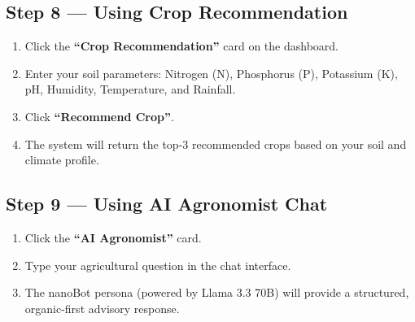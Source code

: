 \documentclass[12pt,oneside]{report}
\begin{document}
\subsection{Step 8 — Using Crop Recommendation}
\begin{enumerate}
    \item Click the \textbf{``Crop Recommendation''} card on the dashboard.
    \item Enter your soil parameters: Nitrogen (N), Phosphorus (P), Potassium (K), pH, Humidity, Temperature, and Rainfall.
    \item Click \textbf{``Recommend Crop''}.
    \item The system will return the top-3 recommended crops based on your soil and climate profile.
\end{enumerate}

\subsection{Step 9 — Using AI Agronomist Chat}
\begin{enumerate}
    \item Click the \textbf{``AI Agronomist''} card.
    \item Type your agricultural question in the chat interface.
    \item The nanoBot persona (powered by Llama 3.3 70B) will provide a structured, organic-first advisory response.
\end{enumerate}
\end{document}
